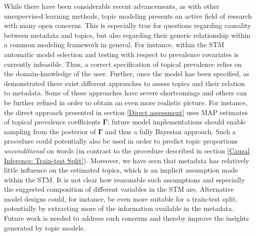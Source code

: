 While there have been considerable recent advancements, as with other unsupervised learning methods, topic modeling presents an active field of research with many open concerns. This is especially true for questions regarding causality between metadata and topics, but also regarding their generic relationship within a common modeling framework in general. For instance, within the STM automatic model selection and testing with respect to prevalence covariates is currently infeasible. Thus, a correct specification of topical prevalence relies on the domain-knowledge of the user. Further, once the model has been specified, as demonstrated there exist different approaches to assess topics and their relation to metadata. Some of these approaches have severe shortcomings and others can be further refined in order to obtain an even more realistic picture. For instance, the direct approach presented in section \ref{Direct assessment} uses MAP estimates of topical prevalence coefficients $\boldsymbol{\Gamma}$; future model implementations should enable sampling from the posterior of $\boldsymbol{\Gamma}$ and thus a fully Bayesian approach. Such a procedure could potentially also be used in order to predict topic proportions \textit{unconditional} on words (in contrast to the procedure described in section \ref{Causal Inference: Train-test Split}). Moreover, we have seen that metadata has relatively little influence on the estimated topics, which is an implicit assumption made within the STM. It is not clear how reasonable such assumptions and especially the suggested composition of different variables in the STM are.
Alternative model designs could, for instance, be even more suitable for a train-test split, potentially by extracting more of the information available in the metadata. Future work is needed to address such concerns and thereby improve the insights generated by topic models.

